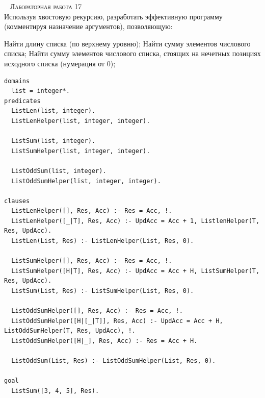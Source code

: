 ~\newpage
\textsc{\huge Лабораторная работа 17} \\

Используя хвостовую рекурсию, разработать эффективную программу (комментируя назначение аргументов), позволяющую:
\begin{tasks}
	\task Найти длину списка (по верхнему уровню);
	\task Найти сумму элементов числового списка;
	\task Найти сумму элементов числового списка, стоящих на нечетных позициях исходного списка (нумерация от 0);
\end{tasks}

\begin{lstlisting}
domains 
  list = integer*.
predicates
  ListLen(list, integer).
  ListLenHelper(list, integer, integer).

  ListSum(list, integer).
  ListSumHelper(list, integer, integer).

  ListOddSum(list, integer).
  ListOddSumHelper(list, integer, integer).

clauses
  ListLenHelper([], Res, Acc) :- Res = Acc, !.
  ListLenHelper([_|T], Res, Acc) :- UpdAcc = Acc + 1, ListlenHelper(T, Res, UpdAcc).
  ListLen(List, Res) :- ListLenHelper(List, Res, 0).

  ListSumHelper([], Res, Acc) :- Res = Acc, !.
  ListSumHelper([H|T], Res, Acc) :- UpdAcc = Acc + H, ListSumHelper(T, Res, UpdAcc).
  ListSum(List, Res) :- ListSumHelper(List, Res, 0).

  ListOddSumHelper([], Res, Acc) :- Res = Acc, !.
  ListOddSumHelper([H|[_|T]], Res, Acc) :- UpdAcc = Acc + H, ListOddSumHelper(T, Res, UpdAcc), !.
  ListOddSumHelper([H|_], Res, Acc) :- Res = Acc + H.

  ListOddSum(List, Res) :- ListOddSumHelper(List, Res, 0).

goal
  ListSum([3, 4, 5], Res).
\end{lstlisting}

